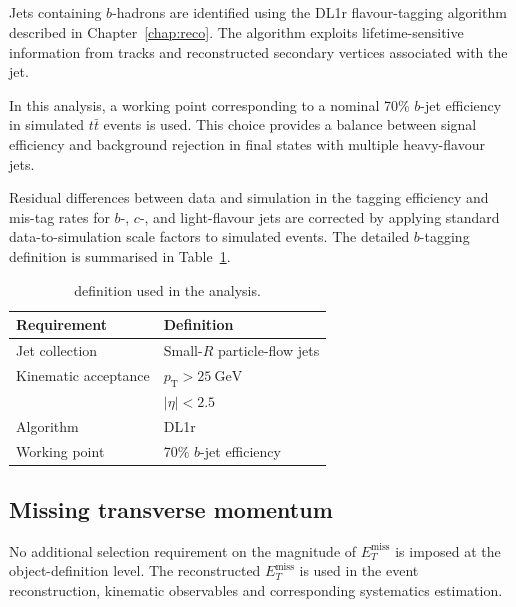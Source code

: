 \subsection{\bTagHead{}}
\label{subsec:obj-btag}

Jets containing $b$-hadrons are identified using the DL1r
flavour-tagging algorithm described in
Chapter~\ref{chap:reco}. The algorithm exploits lifetime-sensitive
information from tracks and reconstructed secondary vertices
associated with the jet.

In this analysis, a working point corresponding to a nominal
70\% $b$-jet efficiency in simulated $t\bar{t}$ events is used.
This choice provides a balance between signal efficiency and
background rejection in final states with multiple heavy-flavour
jets.

Residual differences between data and simulation in the tagging
efficiency and mis-tag rates for $b$-, $c$-, and light-flavour
jets are corrected by applying standard data-to-simulation
scale factors to simulated events.
The detailed $b$-tagging definition is summarised in
Table~\ref{tab:object:btag}.

\begin{table}[ht]
  \caption{\bTagHead{} definition used in the analysis.}
  \label{tab:object:btag}
  \centering
  \begin{tabular}{ll}
    \toprule
    Requirement & Definition \\
    \midrule
    Jet collection & Small-$R$ particle-flow jets \\
    Kinematic acceptance &
    $p_{\mathrm{T}} > 25~\mathrm{GeV}$ \\
    &
    $|\eta| < 2.5$ \\
    \midrule
    Algorithm & DL1r \\
    Working point & 70\% $b$-jet efficiency \\
    \bottomrule
  \end{tabular}
\end{table}

\subsection{Missing transverse momentum}
\label{subsec:obj-met}

No additional selection requirement on the magnitude of
$E^{\mathrm{miss}}_T$ is imposed at the object-definition
level. The reconstructed $E^{\mathrm{miss}}_T$ is used
in the event reconstruction, kinematic observables and corresponding systematics estimation.

